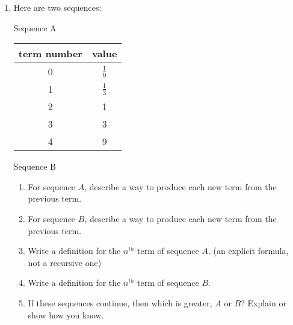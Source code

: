 \documentclass[12pt, twoside]{article}
\begin{document}
\begin{enumerate}
\newpage
\item Here are two sequences:
    \begin{multicols}{2}
        Sequence A
        \renewcommand{\arraystretch}{2}
        \begin{table}[H]
        \begin{tabular}{c|c}
            term number & value \\ \hline
            0 & $\displaystyle \frac{1}{9}$ \\ 
            1 & $\displaystyle \frac{1}{3}$ \\ 
            2 & 1 \\ 
            3 & 3 \\ 
            4 & 9 \\ 
        \end{tabular}
    \end{table} \vspace{2cm}
    \columnbreak
    Sequence B \\
    \end{multicols}
    \begin{enumerate}[itemsep=1.5cm]
        \item For sequence $A$, describe a way to produce each new term from the previous term.
        \item For sequence $B$, describe a way to produce each new term from the previous term.
        \item Write a definition for the $n^{th}$ term of sequence $A$. (an explicit formula, not a recursive one)
        \item Write a definition for the $n^{th}$ term of sequence $B$.
        \item If these sequences continue, then which is greater, $A$ or $B$? Explain or show how you know.
    \end{enumerate}


\end{enumerate}
\end{document}
